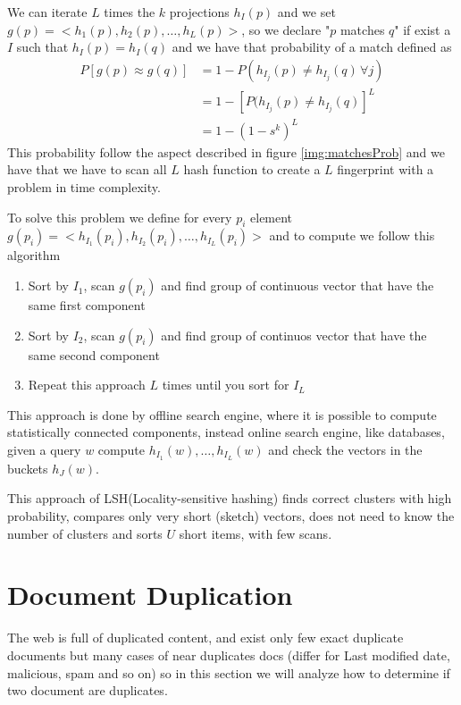 \begin{enumerate}
	      We can iterate $L$ times the $k$ projections $h_I(p)$ and we set $g(p) = <h_1(p), h_2(p), \dots, h_L(p)>$, so we declare "$p$ matches $q$" if exist a $I$ such that
	      $h_I(p) = h_I(q)$ and we have that probability of a match defined as 
	       \begin{align}
		      P[g(p) \approx g(q)] & = 1 - P(h_{I_j}(p) \neq h_{I_j}(q) \, \forall j) \\
		                           & = 1 - [P(h_{I_j}(p) \neq h_{I_j}(q)]^L \\
					   & = 1 - (1 - s^k)^L 
	      \end{align} 
	      This probability follow the aspect described in figure \ref{img:matchesProb} and we have that we have to scan all $L$ hash function to create a $L$ fingerprint 
	      with a problem in time complexity.

	      To solve this problem we define for every $p_i$ element $g(p_i) = <h_{I_1}(p_i), h_{I_2}(p_i), \dots, h_{I_L}(p_i)>$ and to compute we follow this algorithm
	     \begin{enumerate}
		\item Sort by $I_1$, scan $g(p_i)$ and find group of continuous vector that have the same first component
		\item Sort by $I_2$, scan $g(p_i)$ and find group of continuos vector that have the same second component
		\item Repeat this approach $L$ times until you sort for $I_L$
	     \end{enumerate}
	     This approach is done by offline search engine, where it is possible to compute statistically connected components, instead online search engine, like databases, 
	     given a query $w$ compute $h_{I_1}(w), \dots, h_{I_L}(w)$ and check the vectors in the buckets $h_J(w)$.

	    This approach of LSH(Locality-sensitive hashing) finds correct clusters with high probability, compares only very short (sketch) vectors, does not need to know the number
	    of clusters and sorts $U$ short items, with few scans.

    \end{enumerate}

\section{Document Duplication}
    The web is full of duplicated content, and exist only few exact duplicate documents but many cases of near duplicates docs (differ for Last modified date, malicious, spam and so on)
    so in this section we will analyze how to determine if two document are duplicates.

